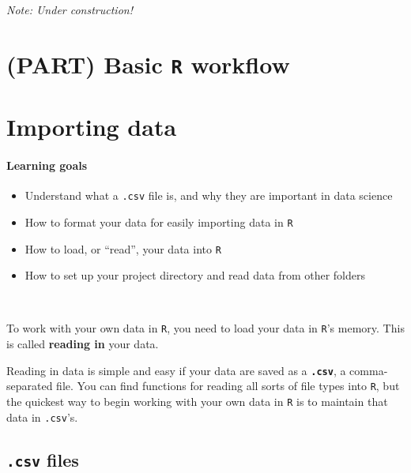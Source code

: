\documentclass[
]{book}
\providecommand{\tightlist}{%
  \setlength{\itemsep}{0pt}\setlength{\parskip}{0pt}}
\begin{document}
\emph{Note: Under construction!}

\hypertarget{part-basic-r-workflow}{%
\chapter*{\texorpdfstring{(PART) Basic \texttt{R} workflow}{(PART) Basic R workflow}}\label{part-basic-r-workflow}}

\hypertarget{importing-data}{%
\chapter{Importing data}\label{importing-data}}

\hypertarget{learning-goals-8}{%
\subsubsection*{Learning goals}\label{learning-goals-8}}

\begin{itemize}
\tightlist
\item
  Understand what a \texttt{.csv} file is, and why they are important in data science
\item
  How to format your data for easily importing data in \texttt{R}
\item
  How to load, or ``read'', your data into \texttt{R}
\item
  How to set up your project directory and read data from other folders
\end{itemize}

~

To work with your own data in \texttt{R}, you need to load your data in \texttt{R}'s memory. This is called \textbf{reading in} your data.

Reading in data is simple and easy if your data are saved as a \textbf{\texttt{.csv}}, a comma-separated file. You can find functions for reading all sorts of file types into \texttt{R}, but the quickest way to begin working with your own data in \texttt{R} is to maintain that data in \texttt{.csv}'s.

\hypertarget{csv-files}{%
\section*{\texorpdfstring{\texttt{.csv} files}{.csv files}}\label{csv-files}}
\end{document}
